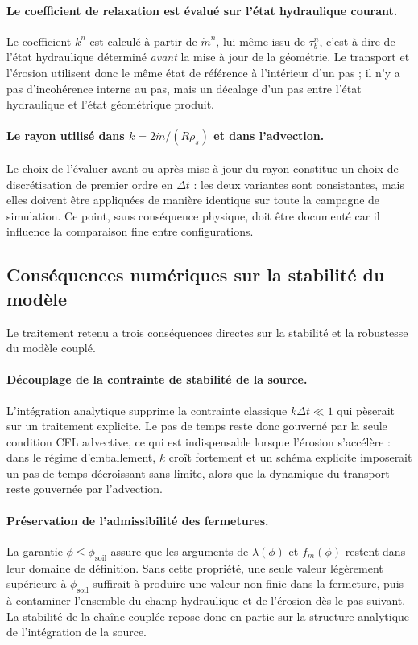 \documentclass[11pt,a4paper]{report}
\newcommand{\phisol}{\phi_{\mathrm{soil}}}
\newcommand{\mdot}{\dot{m}}
\newcommand{\dt}{\Delta t}
\begin{document}
\paragraph{Le coefficient de relaxation est évalué sur l'état hydraulique courant.} Le coefficient \(k^n\)
est calculé à partir de \(\mdot^n\), lui-même issu de \(\tau_b^n\), c'est-à-dire de l'état hydraulique
déterminé \emph{avant} la mise à jour de la géométrie. Le transport et l'érosion utilisent donc le même
état de référence à l'intérieur d'un pas ; il n'y a pas d'incohérence interne au pas, mais un décalage
d'un pas entre l'état hydraulique et l'état géométrique produit.

\paragraph{Le rayon utilisé dans \(k = 2\mdot/(R\rho_s)\) et dans l'advection.} Le choix de l'évaluer
avant ou après mise à jour du rayon constitue un choix de discrétisation de premier ordre en \(\dt\) : les
deux variantes sont consistantes, mais elles doivent être appliquées de manière identique sur toute la
campagne de simulation. Ce point, sans conséquence physique, doit être documenté car il influence la
comparaison fine entre configurations.

\subsection{Conséquences numériques sur la stabilité du modèle}

Le traitement retenu a trois conséquences directes sur la stabilité et la robustesse du modèle couplé.

\paragraph{Découplage de la contrainte de stabilité de la source.} L'intégration analytique supprime la
contrainte classique \(k\dt \ll 1\) qui pèserait sur un traitement explicite. Le pas de temps reste donc
gouverné par la seule condition CFL advective, ce qui est indispensable lorsque l'érosion s'accélère : dans
le régime d'emballement, \(k\) croît fortement et un schéma explicite imposerait un pas de temps
décroissant sans limite, alors que la dynamique du transport reste gouvernée par l'advection.

\paragraph{Préservation de l'admissibilité des fermetures.} La garantie \(\phi\le\phisol\) assure que les
arguments de \(\lambda(\phi)\) et \(f_m(\phi)\) restent dans leur domaine de définition. Sans cette
propriété, une seule valeur légèrement supérieure à \(\phisol\) suffirait à produire une valeur
non finie dans la fermeture, puis à contaminer l'ensemble du champ hydraulique et de l'érosion dès le pas
suivant. La stabilité de la chaîne couplée repose donc en partie sur la structure analytique de
l'intégration de la source.
\end{document}

